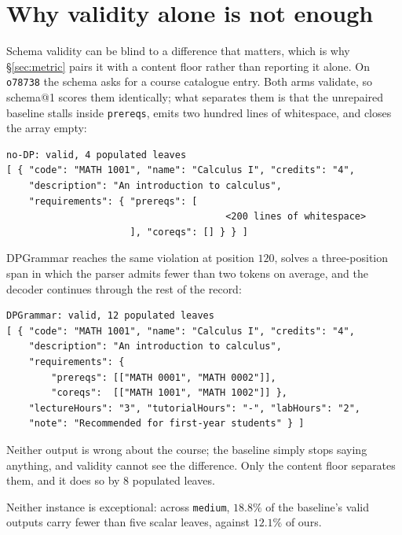 \documentclass{article}
\begin{document}
\section{Why validity alone is not enough}
\label{app:example}

Schema validity can be blind to a difference that matters, which is why
\S\ref{sec:metric} pairs it with a content floor rather than reporting it alone.
On \texttt{o78738} the schema asks for a course catalogue entry. Both arms
validate, so schema@1 scores them identically; what separates them is that the
unrepaired baseline stalls inside \texttt{prereqs}, emits two hundred lines of
whitespace, and closes the array empty:

\begin{center}
\footnotesize
\begin{minipage}{0.86\linewidth}
\begin{verbatim}
no-DP: valid, 4 populated leaves
[ { "code": "MATH 1001", "name": "Calculus I", "credits": "4",
    "description": "An introduction to calculus",
    "requirements": { "prereqs": [
                                       <200 lines of whitespace>
                      ], "coreqs": [] } } ]
\end{verbatim}
\end{minipage}
\end{center}

\noindent
DPGrammar reaches the same violation at position $120$, solves a three-position
span in which the parser admits fewer than two tokens on average, and the
decoder continues through the rest of the record:

\begin{center}
\footnotesize
\begin{minipage}{0.86\linewidth}
\begin{verbatim}
DPGrammar: valid, 12 populated leaves
[ { "code": "MATH 1001", "name": "Calculus I", "credits": "4",
    "description": "An introduction to calculus",
    "requirements": {
        "prereqs": [["MATH 0001", "MATH 0002"]],
        "coreqs":  [["MATH 1001", "MATH 1002"]] },
    "lectureHours": "3", "tutorialHours": "-", "labHours": "2",
    "note": "Recommended for first-year students" } ]
\end{verbatim}
\end{minipage}
\end{center}

\noindent
Neither output is wrong about the course; the baseline simply stops saying
anything, and validity cannot see the difference. Only the content floor
separates them, and it does so by $8$ populated leaves.

Neither instance is exceptional: across \texttt{medium}, $18.8\%$ of the
baseline's valid outputs carry fewer than five scalar leaves, against $12.1\%$
of ours.
\end{document}
